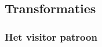 
\subsection{Transformaties}
\label{subsection:transformations}

\TODO

\subsubsection{Het visitor patroon}
\label{subsubsection:devel-visitor-pattern}

\TODO
